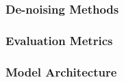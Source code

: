 \subsubsection{De-noising Methods}
\subsubsection{Evaluation Metrics}

\subsubsection{Model Architecture}







